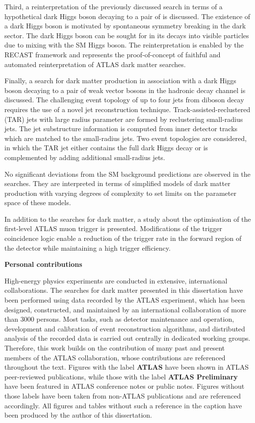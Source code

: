 Third, a reinterpretation of the previously discussed search in terms of a hypothetical dark Higgs boson decaying to a pair of \bquarks is discussed. The existence of a dark Higgs boson is motivated by spontaneous symmetry breaking in the dark sector. The dark Higgs boson can be sought for in its decays into visible particles due to mixing with the SM Higgs boson. The reinterpretation is enabled by the RECAST framework and represents the proof-of-concept of faithful and automated reinterpretation of ATLAS dark matter searches.

Finally, a search for dark matter production in association with a dark Higgs boson decaying to a pair of weak vector bosons in the hadronic decay channel is discussed.
The challenging event topology of up to four jets from diboson decay requires the use of a novel jet reconstruction technique. Track-assisted-reclustered (TAR) jets with large radius parameter are formed by reclustering small-radius jets. The jet substructure information is computed from inner detector tracks which are matched to the small-radius jets. Two event topologies are considered, in which the TAR jet either contains the full dark Higgs decay or is complemented by adding additional small-radius jets.

No significant deviations from the SM background predictions are observed in the searches. They are interpreted in terms of simplified models of dark matter production with varying degrees of complexity to set limits on the parameter space of these models.

In addition to the searches for dark matter, a study about the optimisation of the first-level ATLAS muon trigger is presented. Modifications of the trigger coincidence logic enable a reduction of the trigger rate in the forward region of the detector while maintaining a high trigger efficiency.

\vspace{5.5cm}
\textbf{Personal contributions}

High-energy physics experiments are conducted in extensive, international collaborations. The searches for dark matter presented in this dissertation have been performed using data recorded by the ATLAS experiment, which has been designed, constructed, and maintained by an international collaboration of more than \num{3000} persons. Most tasks, such as detector maintenance and operation, development and calibration of event reconstruction algorithms, and distributed analysis of the recorded data is carried out centrally in dedicated working groups.
Therefore, this work builds on the contribution of many past and present members of the ATLAS collaboration, whose contributions are referenced throughout the text.
Figures with the label \textbf{ATLAS} have been shown in ATLAS peer-reviewed publications, while those with the label \textbf{ATLAS Preliminary} have been featured in ATLAS conference notes or public notes.
Figures without those labels have been taken from non-ATLAS publications and are referenced accordingly.
All figures and tables without such a reference in the caption have been produced by the author of this dissertation.

